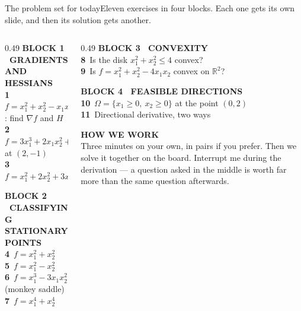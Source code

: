 \documentclass[aspectratio=169,11pt]{beamer}
\newcommand{\kicker}[1]{{\color{hseaccent}\scriptsize\bfseries\MakeUppercase{#1}}}
\newcommand{\num}[1]{{\color{hseaccent}\bfseries #1}}
\begin{document}
\begin{frame}{The problem set for today}{Eleven exercises in four blocks. Each one gets its own slide, and then its solution gets another.}
  \vspace{0.2em}
  \begin{columns}[T,onlytextwidth]
    \begin{column}{0.49\textwidth}
      \kicker{block 1 \textperiodcentered\ gradients and Hessians}\\[0.3em]
      {\small
        \num{1}\ $f=x_1^{2}+x_2^{2}-x_1x_2$: find $\nabla f$ and $H$\\[0.2em]
        \num{2}\ $f=3x_1^{3}+2x_1x_2^{2}+4x_2^{2}$ at $(2,-1)$\\[0.2em]
        \num{3}\ $f=x_1^{2}+2x_2^{2}+3x_3^{2}+2x_1x_2-x_2x_3$}
      \vspace{0.7em}

      \kicker{block 2 \textperiodcentered\ classifying stationary points}\\[0.3em]
      {\small
        \num{4}\ $f=x_1^{2}+x_2^{2}$\\[0.2em]
        \num{5}\ $f=x_1^{2}-x_2^{2}$\\[0.2em]
        \num{6}\ $f=x_1^{3}-3x_1x_2^{2}$ (monkey saddle)\\[0.2em]
        \num{7}\ $f=x_1^{4}+x_2^{4}$}
    \end{column}
    \begin{column}{0.49\textwidth}
      \kicker{block 3 \textperiodcentered\ convexity}\\[0.3em]
      {\small
        \num{8}\ Is the disk $x_1^{2}+x_2^{2}\le4$ convex?\\[0.2em]
        \num{9}\ Is $f=x_1^{2}+x_2^{2}-4x_1x_2$ convex on $\mathbb{R}^2$?}
      \vspace{0.7em}

      \kicker{block 4 \textperiodcentered\ feasible directions}\\[0.3em]
      {\small
        \num{10}\ $\Omega=\{x_1\ge0,\ x_2\ge0\}$ at the point $(0,2)$\\[0.2em]
        \num{11}\ Directional derivative, two ways}
      \vspace{0.7em}

      \kicker{how we work}\\[0.3em]
      {\small Three minutes on your own, in pairs if you prefer. Then we solve it together on the board.
        Interrupt me during the derivation --- a question asked in the middle is worth far more than the same
        question afterwards.}
    \end{column}
  \end{columns}
\end{frame}
\end{document}
